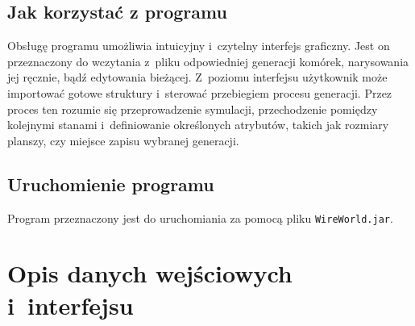 \documentclass[a4paper,11pt]{article}
\begin{document}
	  \subsection{Jak korzystać z programu}
	Obsługę programu umożliwia intuicyjny i~czytelny interfejs graficzny. Jest on przeznaczony do wczytania z~pliku odpowiedniej generacji komórek, narysowania jej ręcznie, bądź edytowania bieżącej. Z~poziomu interfejsu użytkownik może importować gotowe struktury i~sterować przebiegiem procesu generacji. Przez proces ten rozumie się przeprowadzenie symulacji, przechodzenie pomiędzy kolejnymi stanami i~definiowanie określonych atrybutów, takich jak rozmiary planszy, czy miejsce zapisu wybranej generacji.
	  \subsection{Uruchomienie programu}
	Program przeznaczony jest do uruchomiania za pomocą pliku \texttt{WireWorld.jar}.
			
	\newpage
	\section{Opis danych wejściowych i~interfejsu} 
\end{document}
